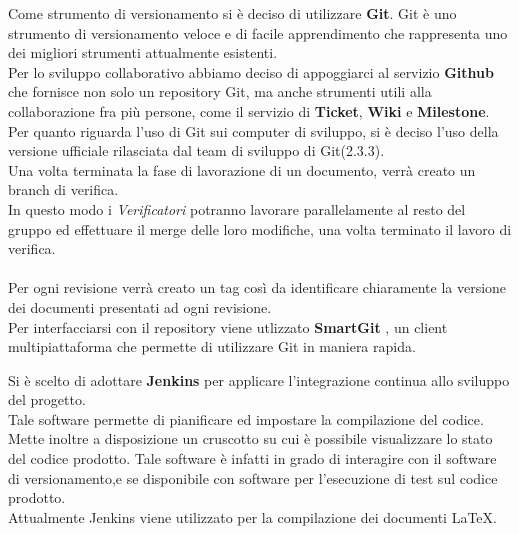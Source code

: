 \documentclass[a4paper,12pt]{article}
\newcounter{subsubsubsection}[subsubsection]
\begin{document}
{{{\begin{itemize}
	\end{itemize}

}
{ 

Come strumento di versionamento si è deciso di utilizzare \textbf{Git}.
Git è uno strumento di versionamento veloce e di facile apprendimento che
rappresenta uno dei migliori strumenti attualmente esistenti.\\ Per lo sviluppo collaborativo abbiamo deciso di appoggiarci al servizio \textbf{Github} che fornisce non solo un repository Git, ma anche strumenti utili alla collaborazione fra più persone, come il servizio di \textbf{Ticket}, \textbf{Wiki} e \textbf{Milestone}.\\
Per quanto riguarda l’uso di Git sui computer di sviluppo, si è deciso l’uso
della versione ufficiale rilasciata dal team di sviluppo di Git(2.3.3).\\
Una volta terminata la fase di lavorazione di un documento, verrà creato un branch di verifica.\\
 In questo modo i \emph{Verificatori} potranno lavorare parallelamente al resto del gruppo ed effettuare il merge delle loro modifiche, una volta terminato il lavoro di verifica. \\\\
Per ogni revisione verrà creato un tag così da identificare chiaramente la versione dei documenti presentati ad ogni revisione. \\
Per interfacciarsi con il repository viene utlizzato \textbf{SmartGit} , un client multipiattaforma che permette di utilizzare Git in maniera rapida.
}
{
Si è scelto di adottare \textbf{Jenkins} per applicare l’integrazione continua allo sviluppo del progetto.\\ 
Tale software permette di pianificare ed impostare la compilazione del codice.\\
Mette inoltre a disposizione un cruscotto su cui è possibile visualizzare lo stato del codice prodotto. Tale software è infatti in grado di interagire con il software di versionamento,e se disponibile con software per l’esecuzione di test sul codice prodotto.\\ 
Attualmente Jenkins viene utilizzato per la compilazione dei documenti \LaTeX. 
}
}
}
\end{document}
